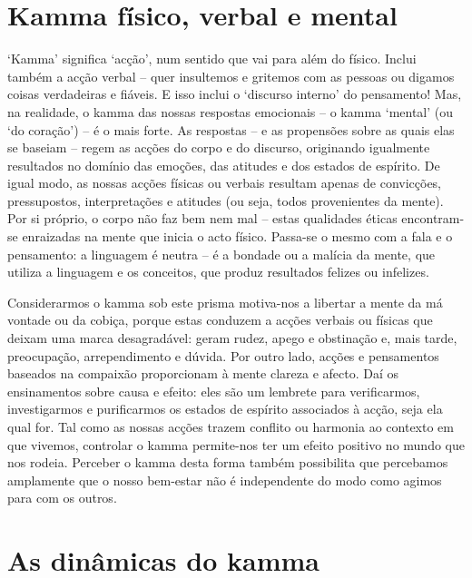\section{Kamma físico, verbal e mental}

`Kamma' significa `acção', num sentido que vai para além do físico. Inclui
também a acção verbal -- quer insultemos e gritemos com as pessoas ou digamos
coisas verdadeiras e fiáveis. E isso inclui o `discurso interno' do pensamento!
Mas, na realidade, o kamma das nossas respostas emocionais -- o kamma `mental'
(ou `do coração') -- é o mais forte. As respostas -- e as propensões sobre as
quais elas se baseiam -- regem as acções do corpo e do discurso, originando
igualmente resultados no domínio das emoções, das atitudes e dos estados de
espírito. De igual modo, as nossas acções físicas ou verbais resultam apenas de
convicções, pressupostos, interpretações e atitudes (ou seja, todos provenientes
da mente). Por si próprio, o corpo não faz bem nem mal -- estas qualidades
éticas encontram-se enraizadas na mente que inicia o acto físico. Passa-se o
mesmo com a fala e o pensamento: a linguagem é neutra -- é a bondade ou a
malícia da mente, que utiliza a linguagem e os conceitos, que produz resultados
felizes ou infelizes.

Considerarmos o kamma sob este prisma motiva-nos a libertar a mente da má
vontade ou da cobiça, porque estas conduzem a acções verbais ou físicas que
deixam uma marca desagradável: geram rudez, apego e obstinação e, mais tarde,
preocupação, arrependimento e dúvida. Por outro lado, acções e pensamentos
baseados na compaixão proporcionam à mente clareza e afecto. Daí os ensinamentos
sobre causa e efeito: eles são um lembrete para verificarmos, investigarmos e
purificarmos os estados de espírito associados à acção, seja ela qual for. Tal
como as nossas acções trazem conflito ou harmonia ao contexto em que vivemos,
controlar o kamma permite-nos ter um efeito positivo no mundo que nos rodeia.
Perceber o kamma desta forma também possibilita que percebamos amplamente que o
nosso bem-estar não é independente do modo como agimos para com os outros.

\section{As dinâmicas do kamma}

